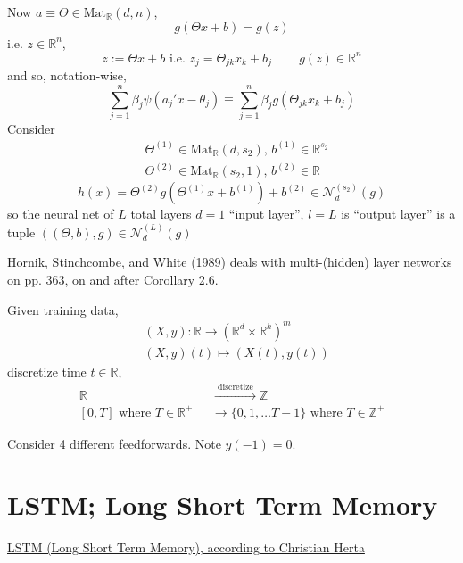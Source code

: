 \documentclass[10pt]{amsart}
\begin{document}
\begin{multicols*}{2}
  Now $a \equiv \Theta \in \text{Mat}_{\mathbb{R}}(d,n)$,
  \[
g(\Theta x + b) = g(z)
\]
i.e. $z\in \mathbb{R}^n$,
\[
z:= \Theta x + b \text{ i.e. } z_j = \Theta_{jk} x_k + b_j \qquad \, g(z) \in \mathbb{R}^n
\]
and so, notation-wise,
\[
\sum_{j=1}^n \beta_j \psi(a_j'x  - \theta_j) \equiv \sum_{j=1}^n \beta_j g(\Theta_{jk} x_k +b_j)
\]
Consider
\[
\begin{aligned}
  & \Theta^{(1)} \in \text{Mat}_{\mathbb{R}}(d,s_2), \, b^{(1)} \in \mathbb{R}^{s_2} \\ 
  & \Theta^{(2)} \in \text{Mat}_{\mathbb{R}}(s_2,1) , \, b^{(2)} \in \mathbb{R}
\end{aligned}
\]
\[
h(x) = \Theta^{(2)}g( \Theta^{(1)}x + b^{(1)}) + b^{(2)} \in \mathcal{N}_d^{(s_2)}(g)
\]
so the neural net of $L$ total layers $d=1$ ``input layer'', $l=L$ is ``output layer'' is a tuple $((\Theta,b),g)\in \mathcal{N}_d^{(L)}(g)$

Hornik, Stinchcombe, and White (1989) \cite{HSW1989} deals with multi-(hidden) layer networks on pp. 363, on and after Corollary 2.6.

Given training data,
\begin{equation}
  \begin{aligned}
    & (X,y) : \mathbb{R} \to (\mathbb{R}^d \times \mathbb{R}^k)^m \\ 
    & (X,y)(t) \mapsto (X(t),y(t))
    \end{aligned}
\end{equation}
discretize time $t\in \mathbb{R}$,
\begin{equation}
  \begin{aligned}
    \mathbb{R} &  \xrightarrow{ \text{ discretize }} \mathbb{Z} \\
 [0,T]\text{ where $T \in \mathbb{R}^+$ } & \to \lbrace 0 , 1, \dots T-1 \rbrace \text{ where } T\in \mathbb{Z}^+
    \end{aligned}
  \end{equation}

Consider 4 different feedforwards.  Note $y(-1)=0$.

\section{LSTM; Long Short Term Memory}

\href{http://www.christianherta.de/lehre/dataScience/machineLearning/neuralNetworks/LSTM.php}{LSTM (Long Short Term Memory), according to Christian Herta}


\end{multicols*}
\end{document}
